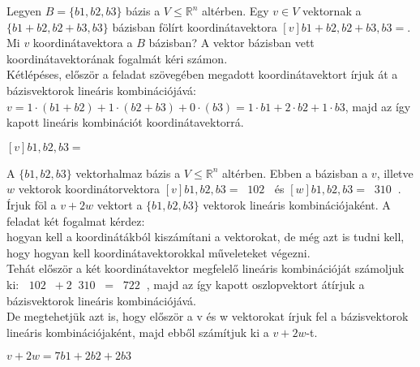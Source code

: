 \begin{frame}
  \begin{tcolorbox}[title={1/2. -R-}]
      Legyen $B = \{b1,b2,b3\}$ bázis a $V ≤ \mathbb{R}^n$ altérben. Egy $v \in V$ vektornak a $\{b1 + b2,b2 + b3,b3\}$ bázisban fölírt koordinátavektora $[v]b1+b2,b2+b3,b3 =$.\\
      
      Mi $v$ koordinátavektora a $B$ bázisban?
  \tcblower
    A vektor bázisban vett koordinátavektorának fogalmát kéri számon.\\
   
    Kétlépéses, először a feladat szövegében megadott koordinátavektort írjuk át a bázisvektorok lineáris kombinációjává: $v = 1 \cdot (b1 + b2) + 1 \cdot (b2 + b3) + 0 \cdot (b3) = 1 \cdot b1 + 2 \cdot b2 + 1 \cdot b3$, majd az így kapott lineáris kombinációt koordinátavektorrá.\\
     \mmedskip
     
   $[v]b1,b2,b3 =$ 
  \end{tcolorbox}
\end{frame}

\begin{frame}
  \begin{tcolorbox}[title={1/3. -R-}]
      A $\{b1,b2,b3\}$ vektorhalmaz bázis a $V ≤ \mathbb{R}^n$ altérben. Ebben a bázisban a $v$, illetve $w$ vektorok koordinátorvektora $[v]b1,b2,b3 =  1 0 2   $ és $[w]b1,b2,b3 =  3 1 0   $. Írjuk föl a $v+2w$ vektort a $\{b1,b2,b3\}$ vektorok lineáris kombinációjaként.
  \tcblower
    A feladat két fogalmat kérdez:\\
      hogyan kell a koordinátákból kiszámítani a vektorokat, de még azt is tudni kell, hogy hogyan kell koordinátavektorokkal műveleteket végezni.\\
      
      Tehát először a két koordinátavektor megfelelő lineáris kombinációját számoljuk ki: $  1 0 2  + 2   3 1 0  =   7 2 2   $, majd az így kapott oszlopvektort átírjuk a bázisvektorok lineáris kombinációjává.\\
      
      De megtehetjük azt is, hogy először a v és w vektorokat írjuk fel a bázisvektorok lineáris kombinációjaként, majd ebből számítjuk ki a $v+2w$-t.
      
   $v + 2w = 7b1 + 2b2 + 2b3$
  \end{tcolorbox}
\end{frame}
  
